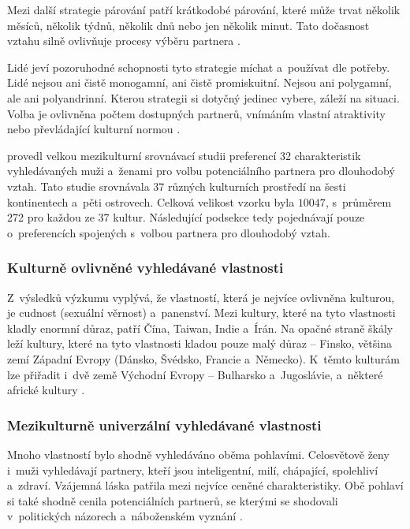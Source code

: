 \documentclass[a4paper, 12pt, notitlepage, oneside, numbers=noenddot]{report}
\begin{document}
Mezi další strategie párování patří krátkodobé párování, které může
trvat několik měsíců, několik týdnů, několik dnů nebo jen několik
minut.  Tato dočasnost vztahu silně ovlivňuje procesy výběru partnera
\citep{Buss2007}.

Lidé jeví pozoruhodné schopnosti tyto strategie míchat a~používat dle
potřeby.  Lidé nejsou ani čistě monogamní, ani čistě promiskuitní.
Nejsou ani polygamní, ale ani poly\-an\-drin\-ní.  Kterou strategii si
dotyčný jedinec vybere, záleží na situaci.  Volba je ovlivněna počtem
dostupných partnerů, vnímáním vlastní atraktivity nebo převládající
kulturní normou \citep{Buss2007,Murstein1970}.

\citet{BussEtAl1990,Buss2007} provedl velkou mezikulturní srovnávací
studii pre\-fe\-rencí 32 charakteristik vyhledávaných muži a~ženami pro
volbu potenciálního partnera pro dlouhodobý vztah.  Tato studie
srovnávala 37 různých kulturních prostředí na šesti kontinentech
a~pěti ostrovech.  Celková velikost vzorku byla $10047$, s~průměrem
272 pro každou ze 37 kultur.  Následující podsekce tedy pojednávají
pouze o~preferencích spojených s~volbou partnera pro dlouhodobý vztah.

\subsubsection{Kulturně ovlivněné vyhledávané vlastnosti}

Z~výsledků výzkumu vyplývá, že vlastností, která je nejvíce ovlivněna
kulturou, je cudnost (sexuální věrnost) a~panenství.  Mezi kultury,
které na tyto vlastnosti kladly enormní důraz, patří Čína, Taiwan,
Indie a~Írán.  Na opačné straně škály leží kultury, které na tyto
vlastnosti kladou pouze malý důraz -- Finsko, většina zemí Západní
Evropy (Dánsko, Švédsko, Francie a~Německo).  K~těmto kulturám lze
přiřadit i~dvě země Východní Evropy -- Bulharsko a~Jugoslávie,
a~některé africké kultury \citep{BussEtAl1990,Buss2007}.

\subsubsection{Mezikulturně univerzální vyhledávané vlastnosti}

Mnoho vlastností bylo shodně vyhledáváno oběma pohlavími.  Celosvětově
ženy i~muži vyhledávají partnery, kteří jsou inteligentní, milí,
chápající, spolehliví a~zdraví.  Vzájemná láska patřila mezi nejvíce
ceněné charakteristiky.  Obě pohlaví si také shodně cenila
potenciálních partnerů, se kterými se shodovali v~politických názorech
a~náboženském vyznání \citep{Buss2007}.
\end{document}
